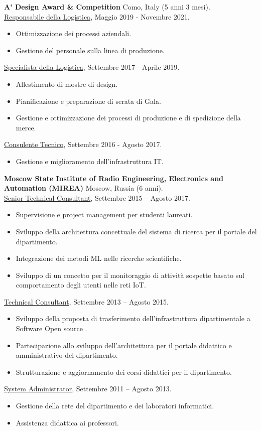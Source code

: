 \documentclass[a4paper,10pt,fullpage]{article}
\begin{document}
\textbf{A' Design Award \& Competition} Como, Italy (5 anni 3 mesi).\\
\underline{Responsabile della Logistica}, Maggio 2019 - Novembre 2021.
\begin{itemize}
	\item[--] Ottimizzazione dei processi aziendali.	
	\item[--] Gestione del personale sulla linea di produzione.
\end{itemize}
\underline{Specialista della Logistica}, Settembre 2017 - Aprile 2019.
\begin{itemize}
	\item[--] Allestimento di mostre di design.
	\item[--] Pianificazione e preparazione di serata di Gala.
	\item[--] Gestione e ottimizzazione dei processi di produzione e di spedizione della merce.
\end{itemize}
\underline{Consulente Tecnico}, Settembre 2016 - Agosto 2017.
\begin{itemize}
	\item[--] Gestione e miglioramento dell'infrastruttura IT.\\
\end{itemize}


\textbf{Moscow State Institute of Radio Engineering, Electronics and Automation (MIREA)} Moscow, Russia (6 anni).\\
\underline{Senior Technical Consultant}, Settembre 2015 – Agosto 2017.
\begin{itemize}
	\item[--] Supervisione e project management per studenti laureati.
	\item[--] Sviluppo della architettura concettuale del sistema di ricerca per il portale del dipartimento.
	\item[--] Integrazione dei metodi ML nelle ricerche scientifiche.
	\item[--] Sviluppo di un concetto per il monitoraggio di attività sospette basato sul comportamento degli utenti nelle reti IoT.
\end{itemize}
\underline{Technical Consultant}, Settembre 2013 – Agosto 2015.
\begin{itemize}
	\item[--] Sviluppo della proposta di trasferimento dell'infrastruttura dipartimentale a Software Open source
	.
	\item[--] Partecipazione allo sviluppo dell'architettura per il portale didattico e amministrativo del dipartimento.
	\item[--] Strutturazione e aggiornamento dei corsi didattici per il dipartimento.
\end{itemize}
\underline{System Administrator}, Settembre 2011 – Agosto 2013.
\begin{itemize}
	\item[--] Gestione della rete del dipartimento e dei laboratori informatici.
	\item[--] Assistenza didattica ai professori.
\end{itemize}
\end{document}
